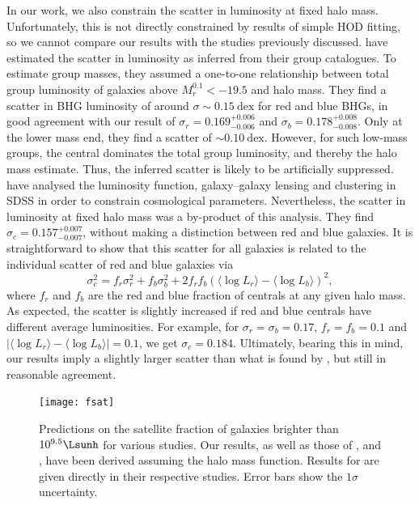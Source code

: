 \documentclass[fleqn,usenatbib,useAMS]{mnras}
\begin{document}
In our work, we also constrain the scatter in luminosity at fixed halo mass. Unfortunately, this is not directly constrained by results of simple HOD fitting, so we cannot compare our results with the studies previously discussed.  \cite{Yang+08} have estimated the scatter in luminosity as inferred from their group catalogues. To estimate group masses, they assumed a one-to-one relationship between total group luminosity of galaxies above $M_r^{0.1} < -19.5$ and halo mass. They find a scatter in BHG luminosity of around $\sigma \sim 0.15 \ \mathrm{dex}$ for red and blue BHGs, in good agreement with our result of $\sigma_r = 0.169_{-0.006}^{+0.006}$ and $\sigma_b = 0.178_{-0.008}^{+0.008}$. Only at the lower mass end, they find a scatter of $\sim 0.10 \ \mathrm{dex}$. However, for such low-mass groups, the central dominates the total group luminosity, and thereby the halo mass estimate. Thus, the inferred scatter is likely to be artificially suppressed. \cite{Cacciato+13} have analysed the luminosity function, galaxy--galaxy lensing and clustering in SDSS in order to constrain cosmological parameters. Nevertheless, the scatter in luminosity at fixed halo mass was a by-product of this analysis. They find $\sigma_c = 0.157_{-0.007}^{+0.007}$, without making a distinction between red and blue galaxies. It is straightforward to show that this scatter for all galaxies is related to the individual scatter of red and blue galaxies via
\begin{equation}
	\sigma_c^2 = f_r \sigma_r^2 + f_b \sigma_b^2 + 2 f_r f_b (\langle \log L_r \rangle - \langle \log L_b \rangle)^2,
\end{equation}
where $f_r$ and $f_b$ are the red and blue fraction of centrals at any given halo mass. As expected, the scatter is slightly increased if red and blue centrals have different average luminosities. For example, for $\sigma_r = \sigma_b = 0.17$, $f_r = f_b = 0.1$ and $|\langle \log L_r \rangle - \langle \log L_b \rangle | = 0.1$, we get $\sigma_c = 0.184$. Ultimately, bearing this in mind, our results imply a slightly larger scatter than what is found by \cite{Cacciato+13}, but still in reasonable agreement.

\begin{figure}
	\centering
	\texttt{[image: fsat]}
	\caption{Predictions on the satellite fraction of galaxies brighter than $10^{9.5} \Lsunh$ for various studies. Our results, as well as those of \protect\cite{Guo+15b}, \protect\cite{Vakili+16} and \protect\cite{Sinha+17}, have been derived assuming the \protect\cite{Tinker+08} halo mass function. Results for \protect\cite{Zehavi+11} are given directly in their respective studies. Error bars show the $1\sigma$ uncertainty.}
	\label{fig:fsat}
\end{figure}
\end{document}
